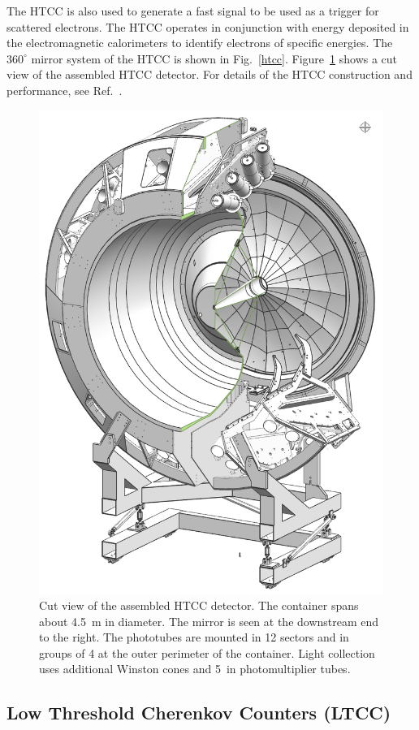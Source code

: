 \documentclass[final,3p,twocolumn]{elsarticle}
\begin{document}
The HTCC is also used to generate a fast signal to be used as a trigger for scattered electrons. The HTCC operates
in conjunction with energy deposited in the electromagnetic calorimeters to identify electrons of specific energies.
The $360^\circ$ mirror system of the HTCC is shown in Fig.~\ref{htcc}. Figure~\ref{HTCC-container} shows a cut view
of the assembled HTCC detector. For details of the HTCC construction and performance, see Ref.~\cite{HTCC}.   

\begin{figure}[htbp!]
\centerline{\includegraphics[width=0.9\columnwidth]{htcc-view-3.png}}
\caption{Cut view of the assembled HTCC detector. The container spans about 4.5~m in diameter. The mirror is
seen at the downstream end to the right. The phototubes are mounted in 12 sectors and in groups of 4 at the outer
perimeter of the container. Light collection uses additional Winston cones and 5~in photomultiplier tubes.}
\label{HTCC-container}
\end{figure}

\subsection{Low Threshold Cherenkov Counters (LTCC)}
\end{document}
